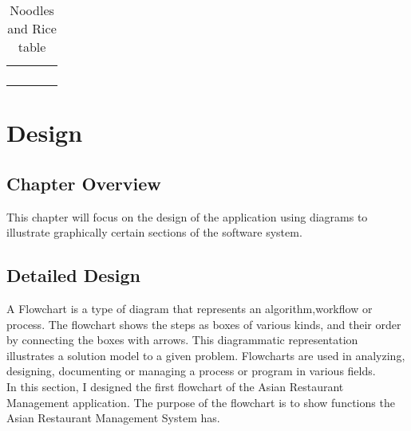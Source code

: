 \documentclass[12pt,a4paper]{article}
\newcommand\tab[1][1cm]{\hspace*{#1}}
\begin{document}
	\begin{table}[H]
		\center
	\caption{Noodles and Rice table}
	\label{tab:nodrice}
	\begin{tabular}{|M{2.5cm}|M{3.5cm}|M{1cm}|N}
	\hline
	\fontsize{10}{5} & \fontsize{10}{5} & \fontsize{10}{5} &\\[10pt]
	\hline
	\fontsize{10}{5}\selectfont {nr-id} & \fontsize{10}{5}\selectfont {tinyint(3)} & \fontsize{10}{5}\selectfont {NO} &\\[10pt]
	\hline
	\fontsize{10}{5}\selectfont {nr-name} & \fontsize{10}{5}\selectfont {varchar(255)} & \fontsize{10}{5}\selectfont {YES} &\\[10pt]
	\hline
	\fontsize{10}{5}\selectfont {nr-price} & \fontsize{10}{5}\selectfont {float(10, 2)} & \fontsize{10}{5}\selectfont {YES} &\\[10pt]
	\hline
	\fontsize{10}{5}\selectfont {nr-details} & \fontsize{10}{5}\selectfont {varchar(255)} & \fontsize{10}{5}\selectfont {YES} &\\[10pt]
	\hline
	\end{tabular}
	\end{table}
	
	
	
\newpage

\section{Design}
	\subsection{Chapter Overview}
	\tab This chapter will focus on the design of the application using diagrams to illustrate graphically certain
sections of the software system.

	\subsection{Detailed Design}
	\tab A Flowchart is a type of diagram that represents an algorithm,workflow or process. The flowchart shows the steps as boxes of various kinds, and their order by connecting the boxes with arrows. This diagrammatic representation illustrates a solution model to a given problem. Flowcharts are used in analyzing, designing, documenting or managing a process or program in various fields.\\
	\tab In this section, I designed the first flowchart of the Asian Restaurant Management application. The purpose
of the flowchart is to show functions the Asian Restaurant Management System has.	
	
\end{document}
